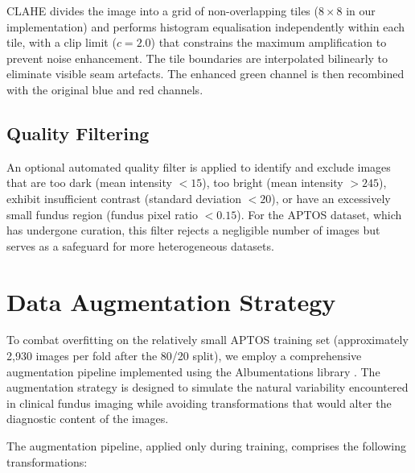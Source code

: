 CLAHE divides the image into a grid of non-overlapping tiles ($8 \times 8$ in our implementation) and performs histogram equalisation independently within each tile, with a clip limit ($c = 2.0$) that constrains the maximum amplification to prevent noise enhancement. The tile boundaries are interpolated bilinearly to eliminate visible seam artefacts. The enhanced green channel is then recombined with the original blue and red channels.

\subsection{Quality Filtering}
\label{sec:quality}

An optional automated quality filter is applied to identify and exclude images that are too dark (mean intensity $< 15$), too bright (mean intensity $> 245$), exhibit insufficient contrast (standard deviation $< 20$), or have an excessively small fundus region (fundus pixel ratio $< 0.15$). For the APTOS dataset, which has undergone curation, this filter rejects a negligible number of images but serves as a safeguard for more heterogeneous datasets.

\section{Data Augmentation Strategy}
\label{sec:augmentation}

To combat overfitting on the relatively small APTOS training set (approximately 2,930 images per fold after the 80/20 split), we employ a comprehensive augmentation pipeline implemented using the Albumentations library \cite{buslaev2020albumentations}. The augmentation strategy is designed to simulate the natural variability encountered in clinical fundus imaging while avoiding transformations that would alter the diagnostic content of the images.

The augmentation pipeline, applied only during training, comprises the following transformations:

